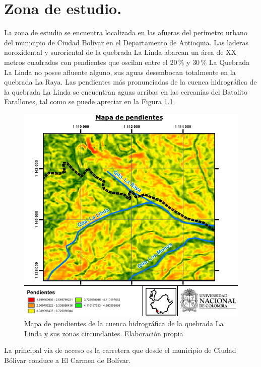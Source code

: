 \chapter{Zona de estudio.}
\label{chap_zonaEstudio}

La zona de estudio se encuentra localizada en las afueras del per\'imetro urbano del municipio de Ciudad Bol\'ivar en el Departamento de Antioquia. 
Las laderas noroxidental y suroriental de la quebrada La Linda abarcan un \'area de XX metros cuadrados con pendientes que oscilan entre el \(20\,\%\) y \(30\,\%\)
La Quebrada La Linda no posee afluente alguno, sus aguas desembocan totalmente en la quebrada La Raya.
Las pendientes m\'as pronunciadas de la cuenca hidrogr\'afica de la quebrada La Linda se encuentran aguas arribas en las cercan\'ias del Batolito Farallones, tal como se puede apreciar en la Figura \ref{fig:slopes}.

\begin{figure}[H]
\centering
\includegraphics[scale=1]{img/pendientes.pdf}
\caption{Mapa de pendientes de la cuenca hidrogr\'afica de la quebrada La Linda y sus zonas circundantes. Elaboraci\'on propia}
\label{fig:slopes}
\end{figure}
La principal v\'ia de acceso es la carretera que desde el municipio de Ciudad B\'olivar conduce a El Carmen de Bol\'ivar.
